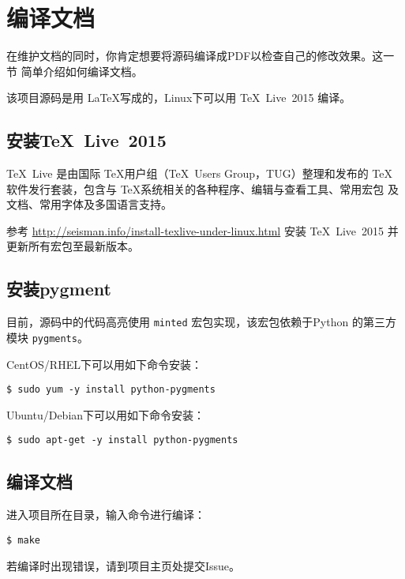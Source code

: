 \section{编译文档}
在维护文档的同时，你肯定想要将源码编译成PDF以检查自己的修改效果。这一节
简单介绍如何编译文档。

该项目源码是用 \LaTeX 写成的，Linux下可以用 \TeX~Live~2015 编译。

\subsection{安装\TeX~Live~2015}
\TeX~Live 是由国际 \TeX 用户组（\TeX~Users Group，TUG）整理和发布的 \TeX
软件发行套装，包含与 \TeX 系统相关的各种程序、编辑与查看工具、常用宏包
及文档、常用字体及多国语言支持。

参考 \url{http://seisman.info/install-texlive-under-linux.html} 安装
TeX~Live~2015 并更新所有宏包至最新版本。

\subsection{安装pygment}
目前，源码中的代码高亮使用 \texttt{minted} 宏包实现，该宏包依赖于Python
的第三方模块 \texttt{pygments}。

CentOS/RHEL下可以用如下命令安装：
\begin{verbatim}
$ sudo yum -y install python-pygments
\end{verbatim}

Ubuntu/Debian下可以用如下命令安装：
\begin{verbatim}
$ sudo apt-get -y install python-pygments
\end{verbatim}

\subsection{编译文档}
进入项目所在目录，输入命令进行编译：
\begin{verbatim}
$ make
\end{verbatim}
若编译时出现错误，请到项目主页处提交Issue。
